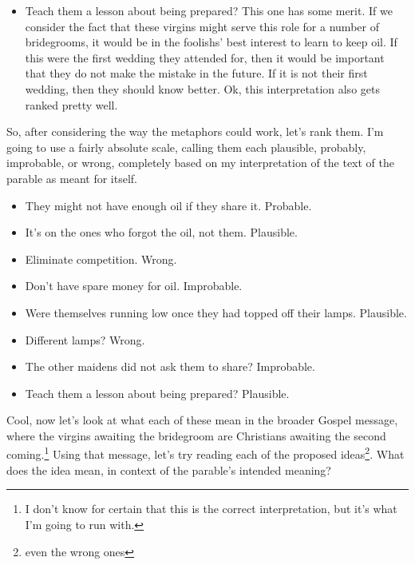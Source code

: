 \documentclass[12pt]{article}[titlepage]
\newcommand{\1}{\={a}}
\newcommand{\2}{\={e}}
\newcommand{\3}{\={\i}}
\newcommand{\4}{\=o}
\newcommand{\5}{\=u}
\newcommand{\6}{\={A}}
\renewcommand{\,}{\textsuperscript{,}}
\begin{document}
\begin{itemize}
{{for our lamps are going out.}}\footnote{Matthew 25: also unknown in this draft}. That being said, I don't know if I like that interpretation.
The response from the wise maidens does not mention their demanding rather than asking, and I don't know whether that works with the broader message.
Still, it's among the better ideas I've had so far.
\item Teach them a lesson about being prepared? This one has some merit.
If we consider the fact that these virgins might serve this role for a number of bridegrooms, it would be in the foolishs' best interest to learn to keep oil.
If this were the first wedding they attended for, then it would be important that they do not make the mistake in the future.
If it is not their first wedding, then they should know better.
Ok, this interpretation also gets ranked pretty well.
\end{itemize}

So, after considering the way the metaphors could work, let's rank them.
I'm going to use a fairly absolute scale, calling them each plausible, probably, improbable, or wrong, completely based on my interpretation of the text of the parable as meant for itself.

\begin{itemize}
\item They might not have enough oil if they share it. Probable.
\item It's on the ones who forgot the oil, not them. Plausible.
\item Eliminate competition. Wrong.
\item Don't have spare money for oil. Improbable.
\item Were themselves running low once they had topped off their lamps. Plausible.
\item Different lamps? Wrong.
\item The other maidens did not ask them to share? Improbable.
\item Teach them a lesson about being prepared? Plausible.
\end{itemize}

Cool, now let's look at what each of these mean in the broader Gospel message, where the virgins awaiting the bridegroom are Christians awaiting the second coming.\footnote{I don't know for certain that this is the correct interpretation, but it's what I'm going to run with.}
Using that message, let's try reading each of the proposed ideas\footnote{even the wrong ones}.
What does the idea mean, in context of the parable's intended meaning?
\end{document}
